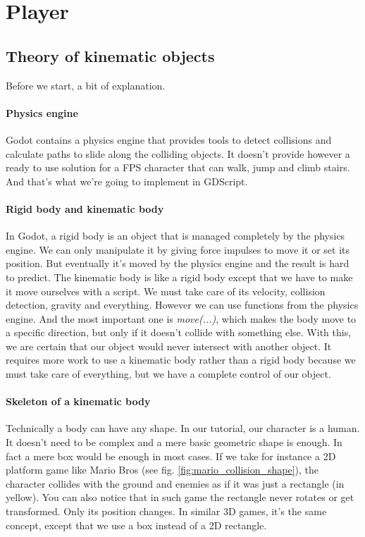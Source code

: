 \documentclass[10pt,a4paper]{article}
\begin{document}
\section{Player}

\subsection{Theory of kinematic objects}
Before we start, a bit of explanation.

\paragraph{Physics engine} Godot contains a physics engine that provides tools to detect collisions and calculate paths to slide along the colliding objects. It doesn't provide however a ready to use solution for a FPS character that can walk, jump and climb stairs. And that's what we're going to implement in GDScript.

\paragraph{Rigid body and kinematic body}
In Godot, a rigid body is an object that is managed completely by the physics engine. We can only manipulate it by giving force impulses to move it or set its position. But eventually it's moved by the physics engine and the result is hard to predict. The kinematic body is like a rigid body except that we have to make it move ourselves with a script. We must take care of its velocity, collision detection, gravity and everything. However we can use functions from the physics engine. And the most important one is \textit{move(...)}, which makes the body move to a specific direction, but only if it doesn't collide with something else. With this, we are certain that our object would never intersect with another object. It requires more work to use a kinematic body rather than a rigid body because we must take care of everything, but we have a complete control of our object.

\paragraph{Skeleton of a kinematic body} Technically a body can have any shape. In our tutorial, our character is a human. It doesn't need to be complex and a mere basic geometric shape is enough. In fact a mere box would be enough in most cases. If we take for instance a 2D platform game like Mario Bros (see fig. \ref{fig:mario_collision_shape}), the character collides with the ground and enemies as if it was just a rectangle (in yellow). You can also notice that in such game the rectangle never rotates or get transformed. Only its position changes. In similar 3D games, it's the same concept, except that we use a box instead of a 2D rectangle. 
\end{document}

